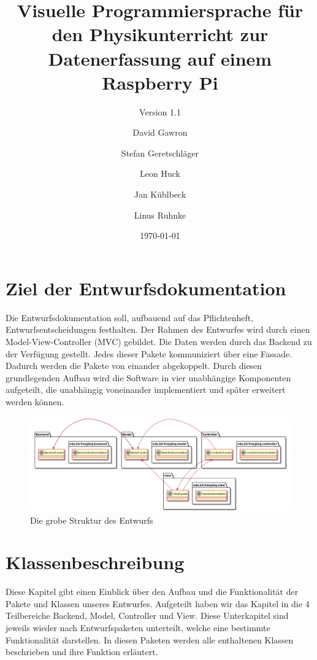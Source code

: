 \documentclass[parskip=full]{scrartcl}
\title{Visuelle Programmiersprache für den Physikunterricht zur Datenerfassung auf einem Raspberry Pi}
\subtitle{Version 1.1}
\author{David Gawron \and Stefan Geretschläger \and Leon Huck \and Jan Küblbeck \and Linus Ruhnke}
\date{\today}
\begin{document}
\maketitle

\clearpage
\tableofcontents 					%

\clearpage
\section{Ziel der Entwurfsdokumentation} \label{einleitung}
Die Entwurfsdokumentation soll, aufbauend auf das Pflichtenheft, Entwurfsentscheidungen festhalten. Der Rahmen des Entwurfes wird durch einen \gls{Model-View-Controller} (MVC) gebildet. Die Daten werden durch das Backend zu der Verfügung gestellt. Jedes dieser Pakete kommuniziert über eine Fassade. Dadurch werden die Pakete von einander abgekoppelt.
Durch diesen grundlegenden Aufbau wird die Software in vier unabhängige Komponenten aufgeteilt, die unabhängig voneinander implementiert und später erweitert werden können.

\begin{figure}[htbp]
	\begin{center}
		\includegraphics[width = 14cm]{Grafiken/Grober_Aufbau.png}
		\caption{Die grobe Struktur des Entwurfs}
		\label{Entwurf_Grob}
	\end{center}
\end{figure}


\clearpage
\section{Klassenbeschreibung}

Diese Kapitel gibt einen Einblick über den Aufbau und die Funktionalität der Pakete und Klassen unseres Entwurfes. Aufgeteilt haben wir das Kapitel in die 4 Teilbereiche Backend, Model, Controller und View. Diese Unterkapitel sind jeweils wieder nach Entwurfspaketen unterteilt, welche eine bestimmte Funktionalität darstellen. In diesen Paketen werden alle enthaltenen Klassen beschrieben und ihre Funktion erläutert.
\end{document}
